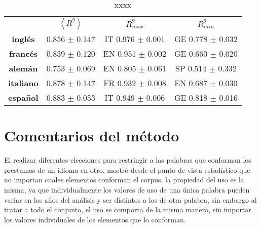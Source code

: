 \begin{table}[h!]
	\centering
	\begin{tabular}{cccc}
		\textbf{} & \textbf{$\left \langle R^{2} \right \rangle$} & \textbf{$R^{2}_{max}$} & \textbf{$R^{2}_{min}$} \\
		\textbf{inglés}   & 0.856 $\pm$ 0.147   &  IT 0.976 $\pm$ 0.001  & GE 0.778 $\pm$ 0.032  \\
		\textbf{francés}  & 0.839 $\pm$ 0.120   &  EN 0.951 $\pm$ 0.002  & GE 0.660 $\pm$ 0.020  \\
		\textbf{alemán}   & 0.753 $\pm$ 0.069   &  EN 0.805 $\pm$ 0.061  & SP 0.514 $\pm$ 0.332  \\
		\textbf{italiano} & 0.878 $\pm$ 0.147   &  FR 0.932 $\pm$ 0.008  & EN 0.687 $\pm$ 0.030  \\
		\textbf{español}  & 0.883 $\pm$ 0.053   &  IT 0.949 $\pm$ 0.006  & GE 0.818 $\pm$ 0.016                                                                
	\end{tabular}
	\caption{xxxx}
	\label{tab.conservacion}
\end{table}



\section{Comentarios del método}

El realizar diferentes elecciones para restringir a las palabras que conforman los prestamos de un idioma en otro, mostró desde el punto de vista estadístico que no importan cuales elementos conforman el corpus, la propiedad del uso es la misma, ya que individualmente los valores de uso de una única palabra pueden variar en los años del análisis y ser distintos a los de otra palabra, sin embargo al tratar a todo el conjunto, el uso se comporta de la misma  manera, sin importar los valores individuales de los elementos que lo conforman. 







